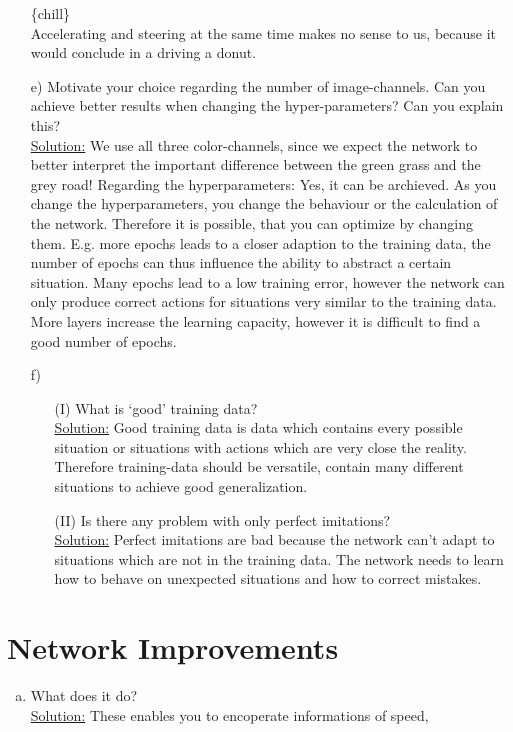 \documentclass[DIN, pagenumber=false, fontsize=11pt, parskip=half]{scrartcl}
\newcommand{\sol}{\underline{Solution:} }
\begin{document}
\begin{enumerate}[b)]
		\{chill\}\\
		Accelerating and steering at the same time makes no sense to us, because it would conclude in a driving a donut. 
	\item[e)] Motivate your choice regarding the number of image-channels. Can you achieve better results when
	changing the hyper-parameters? Can you explain this?\\\sol
        We use all three color-channels, since we expect the network to better interpret the important difference
        between the green grass and the grey road! Regarding the hyperparameters:
	Yes, it can be archieved. As you change the hyperparameters, you change the behaviour or the calculation of the network.
        Therefore it is possible, that you can optimize by changing them. E.g. more epochs leads to a closer adaption to
        the training data, the number of epochs can thus influence the ability to abstract a certain situation. Many
        epochs lead to a low training error, however the network can only produce correct actions for situations very
        similar to the training data. More layers increase the learning capacity, however it is difficult to find a
       good number of epochs.\\
	\item[f)] \begin{enumerate}
		\item[(I)] What is ‘good’ training data? \\\sol
		Good training data is data which contains every possible situation or situations with actions which are very close the reality.
                Therefore training-data should be versatile, contain many different situations to achieve good
                generalization.
		\item[(II)] Is there any problem with only perfect imitations?\\\sol
		Perfect imitations are bad because the network can't adapt to situations which are not in the training data.
                The network needs to learn how to behave on unexpected situations and how to correct mistakes.
	\end{enumerate}
\end{enumerate}
\section{Network Improvements}
\begin{enumerate}[a)]
	\item What does it do?\\\sol These enables you to encoperate informations of speed,
\end{enumerate}
\end{document}
